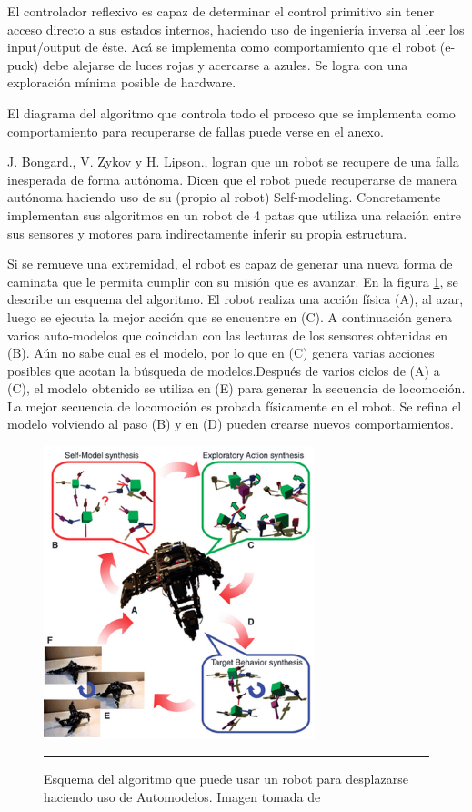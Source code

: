 El controlador reflexivo es capaz de determinar el control primitivo sin tener acceso directo a sus estados internos, haciendo uso de ingeniería inversa al leer los input/output de éste. Acá se implementa como comportamiento que el robot (e-puck) debe alejarse de luces rojas y acercarse a azules. Se logra con una exploración mínima posible de hardware.

El diagrama del algoritmo que controla todo el proceso que se implementa como comportamiento para recuperarse de fallas puede verse en el anexo.

J. Bongard., V. Zykov y H. Lipson., logran que un robot se recupere de una falla inesperada de forma autónoma. Dicen que el robot puede recuperarse de manera autónoma haciendo uso de su (propio al robot) Self-modeling. Concretamente implementan sus algoritmos en un robot de 4 patas que utiliza una relación entre sus sensores y motores para indirectamente inferir su propia estructura.


Si se remueve una extremidad, el robot es capaz de generar una nueva forma de caminata que le permita cumplir con su misión que es avanzar.
En la figura \ref{fig:AutomodeladoLIPSON}, se describe un esquema del algoritmo. El robot realiza una acción física (A), al azar, luego se ejecuta la mejor acción que se encuentre en (C). A continuación genera varios auto-modelos que coincidan con las lecturas de los sensores obtenidas en (B). Aún no sabe cual es el modelo, por lo que en (C) genera varias acciones posibles que acotan la búsqueda de modelos.Después de varios ciclos de (A) a (C),  el modelo obtenido se utiliza en (E) para generar la secuencia de locomoción. La mejor secuencia de locomoción es probada físicamente en el robot. Se refina el modelo volviendo al paso (B) y en (D) pueden crearse nuevos comportamientos.

\begin{figure}[htbp]
	\centering
		\includegraphics[width=0.7\textwidth]{./Figures/algoritmo_automodelo.png}
		\rule{35em}{0.5pt}
	\caption[Esquema algoritmo automodelado Hod Lipson]{Esquema del algoritmo que puede usar un robot para desplazarse haciendo uso de Automodelos. Imagen tomada de \cite{Bongard17112006}}
	\label{fig:AutomodeladoLIPSON}
\end{figure}


